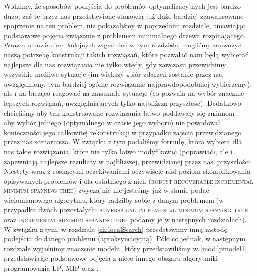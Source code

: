 Widzimy, że sposobów podejścia do problemów optymalizacyjnych jest bardzo dużo, zaś te przez nas przedstawione stanowią już dużo bardziej zaawansowane spojrzenie na ten problem, niż pokazaliśmy w poprzednim rozdziale, omawiając podstawowe pojęcia związanie z problemem minimalnego drzewa rozpinającego. Wraz z omawianiem kolejnych zagadnień w tym rozdziale, mogliśmy zauważyć naszą potrzebę konstrukcji takich rozwiązań, które pozwalać nam będą wybierać najlepsze dla nas rozwiązania nie tylko wtedy, gdy zawczasu przewidzimy wszystkie możliwe sytuacje (im większy zbiór zdarzeń zostanie przez nas uwzględniony, tym bardziej ogólne rozwiązanie najprawdopodobniej wybierzemy), ale i na bieżąco reagować na zaistniałe sytuacje (co pozwala na wybór znacznie lepszych rozwiązań, uwzględniających tylko najbliższą przyszłość). Dodatkowo chcieliśmy aby tak konstruowane rozwiązania łatwo poddawały się zmianom --- aby wybór jednego (optymalnego w czasie jego wyboru) nie powodował konieczności jego całkowitej rekonstrukcji w przypadku zajścia przewidzianego przez nas scenariusza. W związku z tym podaliśmy formułę, która wybiera dla nas takie rozwiązania, które nie tylko łatwo modyfikować (poprawiać), ale i zapewniają najlepsze rezultaty w najbliższej, przewidzianej przez nas, przyszłości. Niestety wraz z rosnącymi oczekiwaniami oczywiście rósł poziom skomplikowania opisywanych problemów i dla ostatniego z nich (\textsc{robust recoverable incremental minimum spanning tree}) zwyczajnie nie jesteśmy już w stanie podać wielomianowego algorytmu, który radziłby sobie z danym problemem (w przypadku dwóch pozostałych: \textsc{adversarial incremental minimum spanning tree} oraz \textsc{incremental minimum spanning tree} podamy je w następnych rozdziałach). W związku z tym, w rozdziale \ref{ch:localSearch} przedstawimy inną metodę podejścia do danego problemu (aproksymacyjną). Póki co jednak, w następnym rozdziale wyjaśnimy znaczenie modelu, który przedstawiliśmy w \ref{mod:lpmodel1}, przedstawiając podstawowe pojęcia z nieco innego obszaru algorytmiki --- programowania \textsc{LP}, \textsc{MIP} oraz .